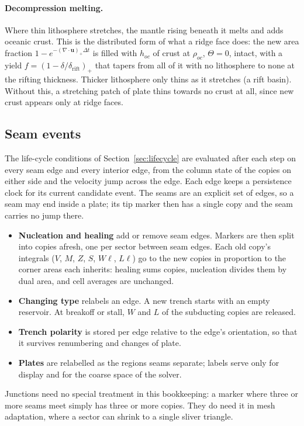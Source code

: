 \documentclass[11pt]{article}
\newcommand{\vect}[1]{\mathbf{#1}}
\begin{document}
\paragraph{Decompression melting.} Where thin lithosphere stretches, the mantle rising beneath it melts and adds oceanic crust. This is the distributed form of what a ridge face does: the new area fraction $1-e^{-(\nabla\cdot\vect{u})_+\Delta t}$ is filled with $h_{oc}$ of crust at $\rho_{oc}$, $\Theta=0$, intact, with a yield $f=(1-\delta/\delta_{\mathrm{rift}})_+$ that tapers from all of it with no lithosphere to none at the rifting thickness. Thicker lithosphere only thins as it stretches (a rift basin). Without this, a stretching patch of plate thins towards no crust at all, since new crust appears only at ridge faces.

\subsection{Seam events}
\label{sec:events}
The life-cycle conditions of Section~\ref{sec:lifecycle} are evaluated after each step on every seam edge and every interior edge, from the column state of the copies on either side and the velocity jump across the edge. Each edge keeps a persistence clock for its current candidate event. The seams are an explicit set of edges, so a seam may end inside a plate; its tip marker then has a single copy and the seam carries no jump there.
\begin{itemize}
\item \textbf{Nucleation and healing} add or remove seam edges. Markers are then split into copies afresh, one per sector between seam edges. Each old copy's integrals ($V$, $M$, $Z$, $S$, $W\ell$, $L\ell$) go to the new copies in proportion to the corner areas each inherits: healing sums copies, nucleation divides them by dual area, and cell averages are unchanged.
\item \textbf{Changing type} relabels an edge. A new trench starts with an empty reservoir. At breakoff or stall, $W$ and $L$ of the subducting copies are released.
\item \textbf{Trench polarity} is stored per edge relative to the edge's orientation, so that it survives renumbering and changes of plate.
\item \textbf{Plates} are relabelled as the regions seams separate; labels serve only for display and for the coarse space of the solver.
\end{itemize}
Junctions need no special treatment in this bookkeeping: a marker where three or more seams meet simply has three or more copies. They do need it in mesh adaptation, where a sector can shrink to a single sliver triangle.
\end{document}
